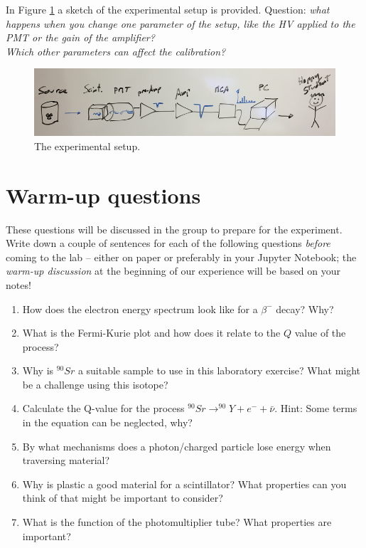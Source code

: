 \documentclass[a4,11pt, notitlepage]{article}
\begin{document}

In Figure \ref{fig:setup} a sketch of the experimental setup is provided. 
Question: \emph{what happens when you change one parameter of the setup, like the HV applied to the PMT or the gain of the amplifier? \\
Which other parameters can affect the calibration?}

\begin{figure}[htbp]
  \begin{center}
    \includegraphics[width=15.0cm]{figures/setup.png}
    \caption{The experimental setup.}
\label{fig:setup}
  \end{center}
\end{figure}

\section{Warm-up questions}
\label{sec:warm-up-questions}

These questions will be discussed in the group to prepare for the experiment.
Write down a couple of sentences for each of the following questions
\emph{before} coming to the lab -- either on paper or preferably in your Jupyter
Notebook; the \emph{warm-up discussion} at the beginning of our experience will be based on your notes!

\begin{enumerate}
\item How does the electron energy spectrum look like for a $\beta^-$ decay?
  Why?
\item What is the Fermi-Kurie plot and how does it relate to the $Q$ value of
  the process?
\item Why is $^{90}Sr$ a suitable sample to use in this laboratory exercise?
  What might be a challenge using this isotope?
\item Calculate the Q-value for the process $^{90}Sr\rightarrow ^{90}Y + e^- +
  \bar{\nu}$. Hint: Some terms in the equation can be neglected, why? 
\item By what mechanisms does a photon/charged particle lose energy
  when traversing material?
\item Why is plastic a good material for a scintillator? What
  properties can you think of that might be important to consider?
\item What is the function of the photomultiplier tube? What properties are important?
\end{enumerate}
\end{document}
